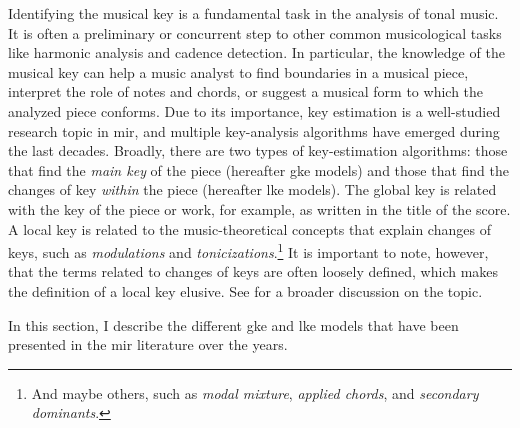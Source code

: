 

Identifying the musical key is a fundamental task in the
analysis of tonal music. It is often a preliminary or
concurrent step to other common musicological tasks like
harmonic analysis and cadence detection. In particular, the
knowledge of the musical key can help a music analyst to
find boundaries in a musical piece, interpret the role of
notes and chords, or suggest a musical form to which the
analyzed piece conforms. Due to its importance, key
estimation is a well-studied research topic in \gls{mir},
and multiple key-analysis algorithms have emerged during the
last decades. Broadly, there are two types of key-estimation
algorithms: those that find the \emph{main key} of the piece
(hereafter \gls{gke} models) and those that find the changes
of key \emph{within} the piece (hereafter \gls{lke} models).
The global key is related with the key of the piece or work,
for example, as written in the title of the score.
A local key is related to the music-theoretical concepts
that explain changes of keys, such as \emph{modulations} and
\emph{tonicizations}.\footnote{And maybe others, such as
\emph{modal mixture}, \emph{applied chords}, and
\emph{secondary dominants}.} It is important to note,
however, that the terms related to changes of keys are often
loosely defined, which makes the definition of a local key
elusive. See \textcite{napoleslopez2020local} for a broader
discussion on the topic.

In this section, I describe the different \gls{gke} and
\gls{lke} models that have been presented in the \gls{mir}
literature over the years.
